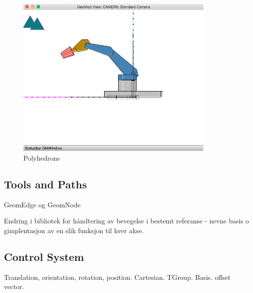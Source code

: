 \begin{figure}[ht]
    \centering
    \includegraphics[height=8cm]{images/GeometricModel.png}
    \caption[Polyhedrons]{Polyhedrons}
    \label{fig:polyhedrons}
\end{figure}



\subsection{Tools and Paths}
GeomEdge og GeomNode


Endring i  bibliotek for håndtering  av  bevegelse  i  bestemt  referanse  -  nevne  basis  o gimplentasjon av en slik funksjon til hver akse.

\subsection{Control System}
Translation, orientation, rotation, position. Cartesian. TGroup. Basis. offset vector.



